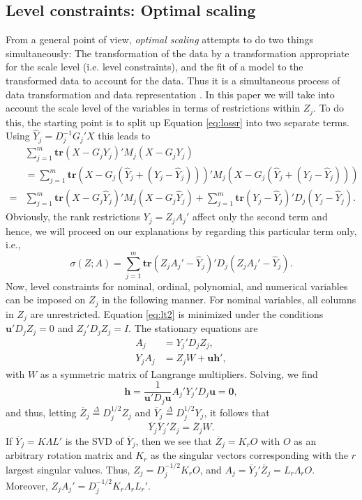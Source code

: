 \documentclass[article, nojss]{jss}
\newcommand{\defi}{\mathop{=}\limits^{\Delta}}
\begin{document}
\subsection{Level constraints: Optimal scaling}
From a general point of view, \emph{optimal scaling} attempts to do two things simultaneously: The transformation of the data by a transformation appropriate for the scale level (i.e. level constraints), and the fit of a model to the transformed data to account for the data. Thus it is a simultaneous process of data transformation and data representation \citep{Takane:2005}. In this paper we will take into account the scale level of the variables in terms of restrictions within $Z_j$. To do this, the starting point is to split up Equation \ref{eq:lossr} into two separate terms. Using \(\hat Y_j=D_j^{-1}G_j'X\) this leads to 
\begin{eqnarray}
 & \sum_{j=1}^m \mathbf{tr}(X-G_jY_j)'M_j(X-G_jY_j) & \nonumber \\
& = \sum_{j=1}^m \mathbf{tr}(X-G_j(\hat Y_j + (Y_j - \hat Y_j)))'M_j(X-G_j(\hat Y_j + (Y_j - \hat Y_j))) & \nonumber \\
= & \sum_{j=1}^m\mathbf{tr}(X-G_j\hat Y_j)'M_j(X-G_j\hat Y_j)+\sum_{j=1}^m \mathbf{tr}(Y_j-\hat Y_j)'D_j(Y_j-\hat Y_j). &
\end{eqnarray}
Obviously, the rank restrictions $Y_j=Z_jA_j'$ affect only the second term and hence, we will proceed on our explanations by regarding this particular term only, i.e.,
\begin{equation}
\label{eq:lt2}
\sigma(Z;A)=\sum_{j=1}^m \mathbf{tr}(Z_jA_j'-\hat Y_j)'D_j(Z_jA_j'-\hat Y_j).
\end{equation}
Now, level constraints for nominal, ordinal, polynomial, and numerical variables can be imposed on $Z_j$ in the following manner. 
For nominal variables, all columns in $Z_j$ are unrestricted. Equation \ref{eq:lt2} is minimized under the conditions $\mathbf{u}'D_jZ_j=0$ and $Z_j'D_jZ_j=I$. The stationary equations are 
\begin{subequations}
\begin{align}
A_j&=Y_j'D_jZ_j,\\
Y_jA_j&=Z_jW+\mathbf{uh}',
\end{align}
\end{subequations}
with $W$ as a symmetric matrix of Langrange multipliers. Solving, we find
\begin{equation}
\mathbf{h}=\frac{1}{\mathbf{u}'D_j\mathbf{u}}A_j'Y_j'D_j\mathbf{u}=\mathbf{0},
\end{equation}
and thus, letting $\overline Z_j\defi D_j^{1/2}Z_j$ and $\overline Y_j\defi D_j^{1/2}Y_j$, it follows that
\begin{equation}
\overline Y_j\overline Y_j' \overline Z_j=\overline Z_jW.
\end{equation}
If $\overline Y_j=K\Lambda L'$ is the SVD of $\overline Y_j$, then
we see that $\overline Z_j=K_rO$ with $O$ as an arbitrary rotation matrix and $K_r$ as the singular vectors corresponding with the $r$ largest singular values. Thus, $Z_j=D_j^{-1/2}K_rO$, and $A_j=\overline Y_j'\overline Z_j=L_r\Lambda_r O$. Moreover, $Z_jA_j'=D_j^{-1/2}K_r\Lambda_rL_r'$.
\end{document}
